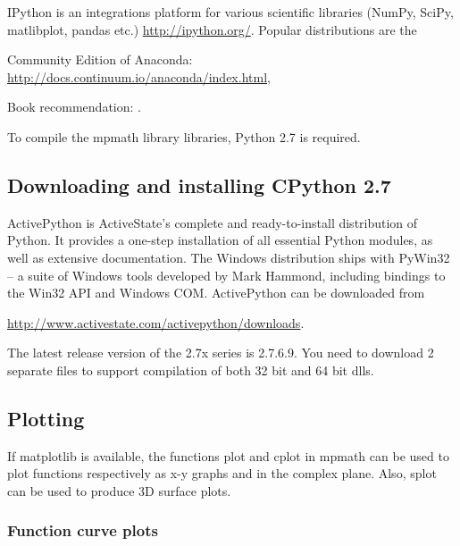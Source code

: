 \vpara
IPython is an integrations platform for various scientific libraries (NumPy, SciPy, matlibplot, pandas etc.) \href{http://ipython.org/}{http://ipython.org/}. Popular distributions are the 

Community Edition of Anaconda: \href{http://docs.continuum.io/anaconda/index.html}{http://docs.continuum.io/anaconda/index.html}, 

%

\vpara
Book recommendation: \cite{McKinney2012}.



To compile the mpmath library libraries, Python 2.7 is required.

\subsection{Downloading and installing  CPython 2.7}
ActivePython is ActiveState's complete and ready-to-install distribution of Python. It provides a one-step installation of all essential Python modules, as well as extensive documentation. 
The Windows distribution ships with PyWin32 -- a suite of Windows tools developed by Mark Hammond, including bindings to the Win32 API and Windows COM. 
ActivePython can be downloaded from

\vpara
\href{http://www.activestate.com/activepython/downloads}{http://www.activestate.com/activepython/downloads}.

\vpara
The latest release version of the 2.7x series is 2.7.6.9. You need to download 2 separate files to support compilation of both 32 bit and 64 bit dlls.






\newpage
\subsection{Plotting}

If matplotlib is available, the functions plot and cplot in mpmath can be used to plot functions respectively as x-y graphs and in the complex plane. Also, splot can be used to
produce 3D surface plots.

\subsubsection{Function curve plots}

